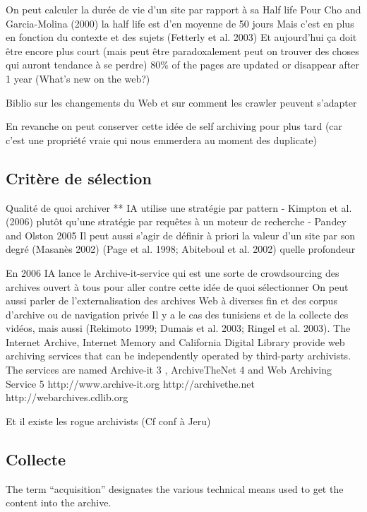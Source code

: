 \documentclass[symmetric,justified,marginals=raggedouter]{tufte-book}
\begin{document}
On peut calculer la durée de vie d'un site par rapport à sa Half life 
Pour Cho and Garcia-Molina (2000) la half life est d'en moyenne de 50 jours
Mais c'est en plus en fonction du contexte et des sujets (Fetterly et al. 2003) 
Et aujourd'hui ça doit être encore plus court (mais peut être paradoxalement peut on trouver des choses qui auront tendance à se perdre)
80\% of the pages are updated or disappear after 1 year (What’s new on the web?)

Biblio sur les changements du Web et sur comment les crawler peuvent s'adapter 

En revanche on peut conserver cette idée de self archiving pour plus tard (car c'est une propriété vraie qui nous emmerdera au moment des duplicate)

\subsection{Critère de sélection}

Qualité de quoi archiver **
IA utilise une stratégie par pattern - Kimpton et al. (2006)
plutôt qu'une stratégie par requêtes à un moteur de recherche - Pandey and Olston 2005
Il peut aussi s'agir de définir à priori la valeur d'un site par son degré (Masanès 2002) (Page et al. 1998; Abiteboul et al. 2002)
quelle profondeur

En 2006 IA lance le Archive-it-service qui est une sorte de crowdsourcing des archives ouvert à tous pour aller contre cette idée de quoi sélectionner 
On peut aussi parler de l'externalisation des archives Web à diverses fin et des corpus d'archive ou de navigation privée 
Il y a le cas des tunisiens et de la collecte des vidéos, mais aussi (Rekimoto 1999; Dumais et al. 2003; Ringel et al. 2003).
The Internet Archive, Internet Memory and California Digital Library provide
web archiving services that can be independently operated by third-party archivists. The
services are named Archive-it 3 , ArchiveTheNet 4 and Web Archiving Service 5
http://www.archive-it.org
http://archivethe.net
http://webarchives.cdlib.org

Et il existe les rogue archivists (Cf conf à Jeru)

\subsection{Collecte}

The term “acquisition” designates the various technical means used to get the content into the archive.
\end{document}
